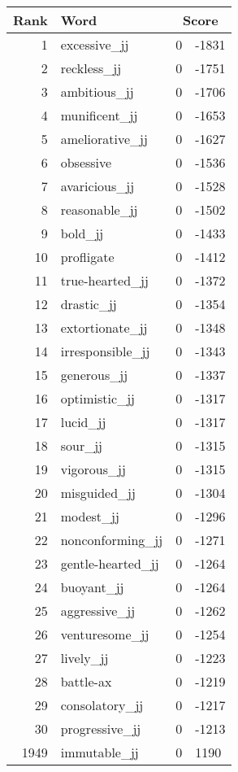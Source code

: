 \begin{longtable}[!htbp]{| rlr@{.}l |}
    \hline
    \textbf{Rank} & \textbf{Word} & \multicolumn{2}{c|}{\textbf{Score}} \\
    \hline
    \endhead
    1 & excessive\_jj & 0 & -1831 \\
    2 & reckless\_jj & 0 & -1751 \\
    3 & ambitious\_jj & 0 & -1706 \\
    4 & munificent\_jj & 0 & -1653 \\
    5 & ameliorative\_jj & 0 & -1627 \\
    6 & obsessive & 0 & -1536 \\
    7 & avaricious\_jj & 0 & -1528 \\
    8 & reasonable\_jj & 0 & -1502 \\
    9 & bold\_jj & 0 & -1433 \\
    10 & profligate & 0 & -1412 \\
    11 & true-hearted\_jj & 0 & -1372 \\
    12 & drastic\_jj & 0 & -1354 \\
    13 & extortionate\_jj & 0 & -1348 \\
    14 & irresponsible\_jj & 0 & -1343 \\
    15 & generous\_jj & 0 & -1337 \\
    16 & optimistic\_jj & 0 & -1317 \\
    17 & lucid\_jj & 0 & -1317 \\
    18 & sour\_jj & 0 & -1315 \\
    19 & vigorous\_jj & 0 & -1315 \\
    20 & misguided\_jj & 0 & -1304 \\
    21 & modest\_jj & 0 & -1296 \\
    22 & nonconforming\_jj & 0 & -1271 \\
    23 & gentle-hearted\_jj & 0 & -1264 \\
    24 & buoyant\_jj & 0 & -1264 \\
    25 & aggressive\_jj & 0 & -1262 \\
    26 & venturesome\_jj & 0 & -1254 \\
    27 & lively\_jj & 0 & -1223 \\
    28 & battle-ax & 0 & -1219 \\
    29 & consolatory\_jj & 0 & -1217 \\
    30 & progressive\_jj & 0 & -1213 \\
    1949 & immutable\_jj & 0 & 1190 \\

\end{longtable}
